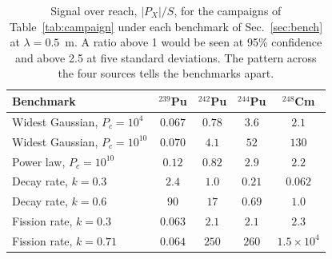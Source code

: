 \begin{table}[!htbp]
\caption{\label{tab:fingerprint}Signal over reach, $|P_X|/S$, for the campaigns of Table~\ref{tab:campaign} under each
benchmark of Sec.~\ref{sec:bench} at $\lambda=0.5$~m. A ratio above 1 would be seen at 95\% confidence and above 2.5
at five standard deviations. The pattern across the four sources tells the benchmarks apart.}
\begin{ruledtabular}
\begin{tabular}{lcccc}
Benchmark & $^{239}$Pu & $^{242}$Pu & $^{244}$Pu & $^{248}$Cm\\
\hline
Widest Gaussian, $P_c=10^{4}$ & $0.067$ & $0.78$ & $3.6$ & $2.1$ \\
Widest Gaussian, $P_c=10^{10}$ & $0.070$ & $4.1$ & $52$ & $130$ \\
Power law, $P_c=10^{10}$ & $0.12$ & $0.82$ & $2.9$ & $2.2$ \\
Decay rate, $k=0.3$ & $2.4$ & $1.0$ & $0.21$ & $0.062$ \\
Decay rate, $k=0.6$ & $90$ & $17$ & $0.69$ & $1.0$ \\
Fission rate, $k=0.3$ & $0.063$ & $2.1$ & $2.1$ & $2.3$ \\
Fission rate, $k=0.71$ & $0.064$ & $250$ & $260$ & $1.5\times10^{4}$ \\
\end{tabular}
\end{ruledtabular}
\end{table}
